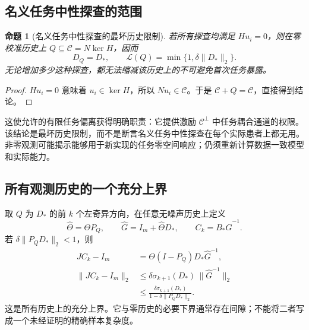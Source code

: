 \documentclass[11pt,a4paper]{article}
\numberwithin{equation}{section}
\newtheorem{proposition}[theorem]{命题}
\theoremstyle{definition}
\begin{document}
\subsection{名义任务中性探查的范围}

\begin{proposition}[名义任务中性探查的最坏历史限制]
\label{prop:cal-neutral}
若所有探查均满足 $Hu_i=0$，则在零校准历史上 $Q\subseteq\mathcal C=N\ker H$，因而
\begin{equation}
  D_Q=D_*,
  \qquad
  \mathcal L(Q)=\min\{1,\delta\|D_*\|_2\}.
  \label{eq:cal-neutral-no-width}
\end{equation}
无论增加多少这种探查，都无法缩减该历史上的不可避免首次任务暴露。
\end{proposition}

\begin{proof}
$Hu_i=0$ 意味着 $u_i\in\ker H$，所以 $Nu_i\in\mathcal C$。于是 $\mathcal C+Q=\mathcal C$，直接得到结论。
\end{proof}

这使允许的有限任务偏离获得明确职责：它提供激励 $\mathcal C^\perp$ 中任务耦合通道的权限。该结论是最坏历史限制，而不是断言名义任务中性探查在每个实际患者上都无用。非零观测可能揭示能够用于新实现的任务零空间响应；仍须重新计算数据一致模型和实际能力。

\subsection{所有观测历史的一个充分上界}

取 $Q$ 为 $D_*$ 的前 $k$ 个左奇异方向，在任意无噪声历史上定义
\begin{equation}
  \widehat\Theta=\Theta P_Q,\qquad
  \widehat G=I_m+\widehat\Theta D_*,
  \qquad C_k=B_*\widehat G^{-1}.
\end{equation}
若 $\delta\|P_QD_*\|_2<1$，则
\begin{align}
  JC_k-I_m
  &=\Theta(I-P_Q)D_*\widehat G^{-1},\\
  \|JC_k-I_m\|_2
  &\le
  \delta\sigma_{k+1}(D_*)\,
  \|\widehat G^{-1}\|_2\\
  &\le
  \frac{\delta\sigma_{k+1}(D_*)}
  {1-\delta\|P_QD_*\|_2}.
  \label{eq:cal-nonzero-upper}
\end{align}
这是所有历史上的充分上界。它与零历史的必要下界通常存在间隙；不能将二者写成一个未经证明的精确样本复杂度。





\end{document}
